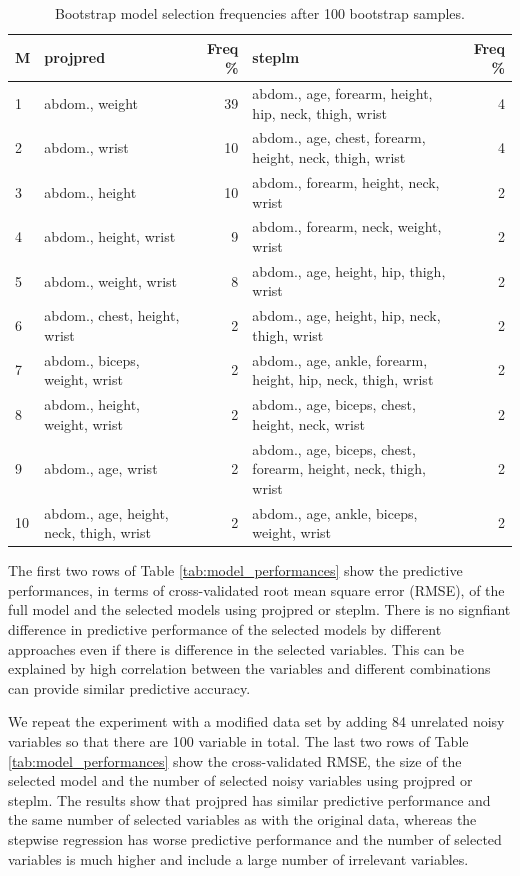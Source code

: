 \documentclass[a4]{article}
\theoremstyle{definition}
\begin{document}
\begin{table}[tp]
\footnotesize
\centering
\begin{tabular}{l|lr|lr}
M & projpred & Freq \% & steplm & Freq \%  \\ 
  \hline
1 & abdom., weight & 39 & abdom., age, forearm, height, hip, neck, thigh, wrist & 4 \\
2 & abdom., wrist & 10 & abdom., age, chest, forearm, height, neck, thigh, wrist & 4 \\
3 & abdom., height & 10 & abdom., forearm, height, neck, wrist & 2 \\
4 & abdom., height, wrist & 9 & abdom., forearm, neck, weight, wrist & 2 \\
5 & abdom., weight, wrist & 8 & abdom., age, height, hip, thigh, wrist & 2 \\
6 & abdom., chest, height, wrist & 2 & abdom., age, height, hip, neck, thigh, wrist & 2 \\
7 & abdom., biceps, weight, wrist & 2 & abdom., age, ankle, forearm, height, hip, neck, thigh, wrist & 2 \\
8 & abdom., height, weight, wrist & 2 & abdom., age, biceps, chest, height, neck, wrist & 2 \\
9 & abdom., age, wrist & 2 & abdom., age, biceps, chest, forearm, height, neck, thigh, wrist & 2 \\
10 & abdom., age, height, neck, thigh, wrist & 2 & abdom., age, ankle, biceps, weight, wrist & 2 \\
\end{tabular}
\caption{Bootstrap model selection frequencies after 100 bootstrap samples.}
\label{tab:model_frequencies}
\end{table}


The first two rows of Table \ref{tab:model_performances} show the
predictive performances, in terms of cross-validated root mean square
error (RMSE), of the full model and the selected models using projpred
or steplm.  There is no signfiant difference in predictive performance
of the selected models by different approaches even if there is
difference in the selected variables. This can be explained by high
correlation between the variables and different combinations can
provide similar predictive accuracy.

We repeat the experiment with a modified data set by adding 84
unrelated noisy variables so that there are 100 variable in total. 
The last two rows of Table
\ref{tab:model_performances} show the cross-validated RMSE, the size
of the selected model and the number of selected noisy variables using
projpred or steplm. The results show that projpred has similar
predictive performance and the same number of selected variables as
with the original data, whereas the stepwise regression has worse
predictive performance and the number of selected variables is much
higher and include a large number of irrelevant variables.
\end{document}
